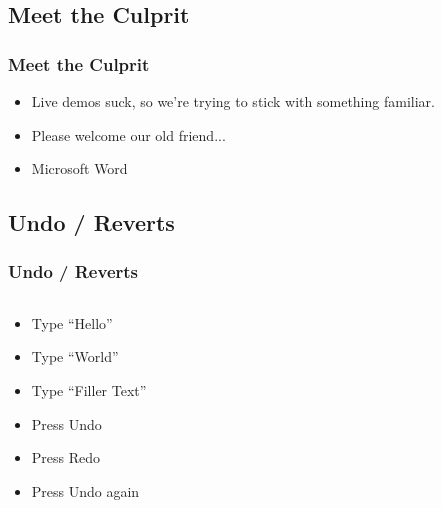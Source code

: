 \documentclass{beamer}
\begin{document}
\subsection{Meet the Culprit}
\begin{frame}
    \frametitle{Meet the Culprit}
    \begin{itemize}[<+->]
        \item Live demos suck, so we're trying to stick with something familiar.
        \item Please welcome our old friend...
        \item Microsoft Word
    \end{itemize}
\end{frame}

\subsection{Undo / Reverts}
\begin{frame}
    \frametitle{Undo / Reverts}

    \begin{columns}
        \begin{column}{0.5\textwidth}
            \begin{itemize}[<+->]
                    \pause
                \item Type ``Hello''
                \item Type ``World''
                \item Type ``Filler Text''
                \item Press Undo
                \item Press Redo
                \item Press Undo again
            \end{itemize}
        \end{column}
        \begin{column}{0.5\textwidth}
        \end{column}
    \end{columns}
\end{frame}
\end{document}
